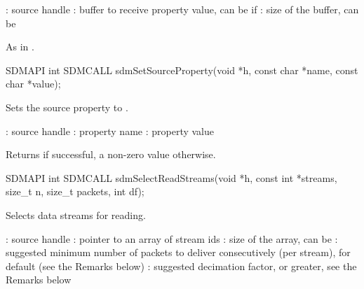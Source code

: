 \documentclass[a4paper,12pt,twoside,extrafontsizes]{memoir}
\begin{document}
\begin{funcparams}
	: source handle
	: buffer to receive property value, can be  if 
	: size of the buffer, can be 
\end{funcparams}

\begin{funcret}
	As in .
\end{funcret}



\begin{cfuncprototype}
SDMAPI int SDMCALL sdmSetSourceProperty(void *h, const char *name, const char *value);
\end{cfuncprototype}

\begin{funcdescr}
	Sets the source property  to .
\end{funcdescr}

\begin{funcparams}
	: source handle
	: property name
	: property value
\end{funcparams}

\begin{funcret}
	Returns  if successful, a non-zero value otherwise.
\end{funcret}



\begin{cfuncprototype}
SDMAPI int SDMCALL sdmSelectReadStreams(void *h, const int *streams, size_t n, size_t packets, int df);
\end{cfuncprototype}

\begin{funcdescr}
	Selects data streams for reading.
\end{funcdescr}

\begin{funcparams}
	: source handle
	: pointer to an array of stream ids
	: size of the array, can be 
	: suggested minimum number of packets to deliver consecutively (per stream),  for default (see the Remarks below)
	: suggested decimation factor,  or greater, see the Remarks below
\end{funcparams}
\end{document}
